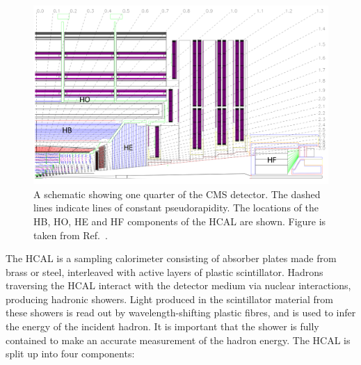 \begin{figure}
  \centering
  \includegraphics[width=.9\textwidth]{Figures/cms/hcal.pdf}
  \caption[The CMS hadronic calorimeter]
  {
    A schematic showing one quarter of the CMS detector. The dashed lines indicate lines of constant pseudorapidity. The locations of the HB, HO, HE and HF components of the HCAL are shown. Figure is taken from Ref.~\cite{Chatrchyan:2008zzk}.
  }
  \label{fig:cms_hcal}
\end{figure}

The HCAL is a sampling calorimeter consisting of absorber plates made from brass or steel, interleaved with active layers of plastic scintillator. Hadrons traversing the HCAL interact with the detector medium via nuclear interactions, producing hadronic showers. Light produced in the scintillator material from these showers is read out by wavelength-shifting plastic fibres, and is used to infer the energy of the incident hadron. It is important that the shower is fully contained to make an accurate measurement of the hadron energy. The HCAL is split up into four components:

